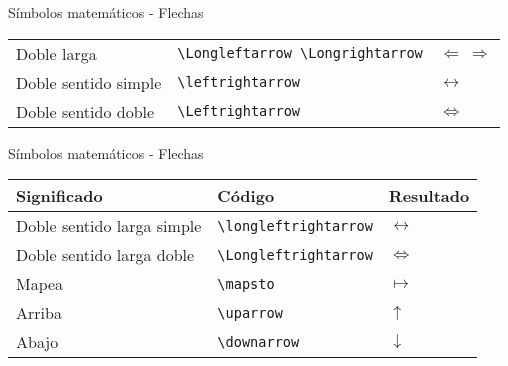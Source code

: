 \documentclass[ignorenonframetext,]{beamer}
\begin{document}
\begin{frame}[fragile]{Símbolos matemáticos - Flechas}
\begin{longtable}[]{@{}lll@{}}
\begin{minipage}[t]{0.30\columnwidth}
Doble larga\strut
\end{minipage} & \begin{minipage}[t]{0.30\columnwidth}\raggedright
\texttt{\textbackslash{}Longleftarrow\ \textbackslash{}Longrightarrow}\strut
\end{minipage} & \begin{minipage}[t]{0.30\columnwidth}\raggedright
\(\Longleftarrow\ \Longrightarrow\)\strut
\end{minipage}\tabularnewline
\begin{minipage}[t]{0.30\columnwidth}\raggedright
Doble sentido simple\strut
\end{minipage} & \begin{minipage}[t]{0.30\columnwidth}\raggedright
\texttt{\textbackslash{}leftrightarrow}\strut
\end{minipage} & \begin{minipage}[t]{0.30\columnwidth}\raggedright
\(\leftrightarrow\)\strut
\end{minipage}\tabularnewline
\begin{minipage}[t]{0.30\columnwidth}\raggedright
Doble sentido doble\strut
\end{minipage} & \begin{minipage}[t]{0.30\columnwidth}\raggedright
\texttt{\textbackslash{}Leftrightarrow}\strut
\end{minipage} & \begin{minipage}[t]{0.30\columnwidth}\raggedright
\(\Leftrightarrow\)\strut
\end{minipage}\tabularnewline
\bottomrule
\end{longtable}

\end{frame}

\begin{frame}[fragile]{Símbolos matemáticos - Flechas}
\protect\hypertarget{simbolos-matematicos---flechas-1}{}

\begin{longtable}[]{@{}lll@{}}
\toprule
Significado & Código & Resultado\tabularnewline
\midrule
\endhead
Doble sentido larga simple & \texttt{\textbackslash{}longleftrightarrow}
& \(\longleftrightarrow\)\tabularnewline
Doble sentido larga doble & \texttt{\textbackslash{}Longleftrightarrow}
& \(\Longleftrightarrow\)\tabularnewline
Mapea & \texttt{\textbackslash{}mapsto} & \(\mapsto\)\tabularnewline
Arriba & \texttt{\textbackslash{}uparrow} & \(\uparrow\)\tabularnewline
Abajo & \texttt{\textbackslash{}downarrow} &
\(\downarrow\)\tabularnewline
\bottomrule
\end{longtable}

\end{frame}
\end{document}
